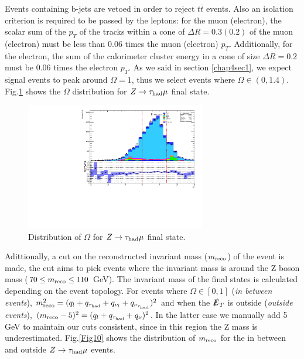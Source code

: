 Events containing b-jets are vetoed in order to reject $t\bar{t}$ events. Also an isolation criterion is required to be passed by the leptons: for the muon (electron), the scalar sum of the $p_T$ of the tracks within a cone of $\Delta R=0.3 (0.2)$ of the muon (electron) must be less than 0.06 times the muon (electron) $p_T$. Additionally, for the electron, the sum of the calorimeter cluster energy in a cone of size $\Delta R=0.2$ must be 0.06 times the electron $p_T$. As we said in section \ref{chap4sec1}, we expect signal events to peak around $\Omega=1$, thus we select events where $\Omega\in (0,1.4)$. Fig.\ref{Fig9} shows the $\Omega$ distribution for $Z\to\tau_\text{had}\mu$ final state.
\begin{figure}[h]
	\centering
	\includegraphics[width=0.7\textwidth]{figures/Fig9}
	\caption{Distribution of $\Omega$ for $Z\to\tau_\text{had}\mu$ final state. }
	\label{Fig9}
\end{figure}
Adittionally, a cut on the reconstructed invariant mass ($m_{\text{reco}}$) of the event is made, the cut aims to pick events where the invariant mass is around the Z boson mass ($70\leq m_{\text{reco}}\leq 110$ GeV). The invariant mass of the final states is calculated depending on the event topology. For events where $\Omega\in [0,1]$ (\textit{in between events}),  $m_{\text{reco}}^{2}=(q_l+q_{\tau_\text{had}}+q_{\nu_l}+q_{\nu_{\tau_\text{had}}})^2$ and when the $\slashed{E}_T$ is outside (\textit{outside events}), $(m_{\text{reco}}-5)^{2}=(q_l+q_{\tau_\text{had}}+q_\nu)^2$. In the latter case we manually add 5 GeV to maintain our cuts consistent, since in this region the Z mass is underestimated. Fig.\ref{Fig10} shows the distribution of $m_{\text{reco}}$ for the in between and outside $Z\to\tau_\text{had}\mu$ events. 
